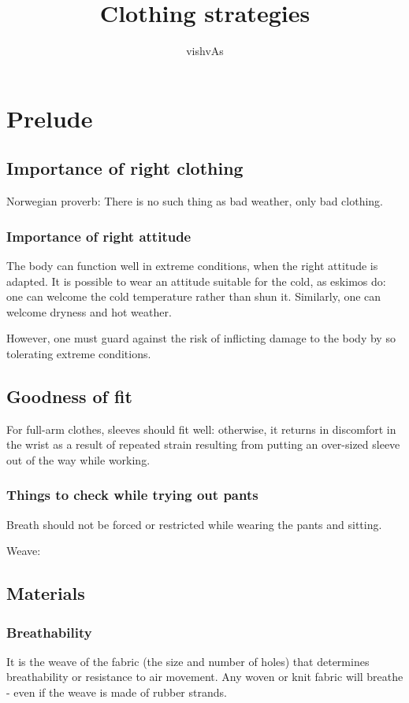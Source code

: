 \documentclass[oneside, article]{memoir}
\title{Clothing strategies}
\author{vishvAs}
\begin{document}
\maketitle

\chapter{Prelude}
\section{Importance of right clothing}
Norwegian proverb: There is no such thing as bad weather, only bad clothing.

\subsection{Importance of right attitude}
The body can function well in extreme conditions, when the right attitude is adapted. It is possible to wear an attitude suitable for the cold, as eskimos do: one can welcome the cold temperature rather than shun it. Similarly, one can welcome dryness and hot weather.

However, one must guard against the risk of inflicting damage to the body by so tolerating extreme conditions.

\section{Goodness of fit}
For full-arm clothes, sleeves should fit well: otherwise, it returns in discomfort in the wrist as a result of repeated strain resulting from putting an over-sized sleeve out of the way while working.


\subsection{Things to check while trying out pants}
Breath should not be forced or restricted while wearing the pants and sitting.

Weave:

\section{Materials}
\subsection{Breathability}
It is the weave of the fabric (the size and number of holes) that determines breathability or resistance to air movement. Any woven or knit fabric will breathe - even if the weave is made of rubber strands.
\end{document}
